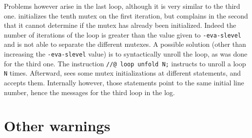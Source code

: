 \documentclass{frama-c-book}
\begin{document}
Problems however arise in the last loop, although it is very similar
to the third one. \mthread initializes the tenth mutex on the first
iteration, but complains in the second that it cannot determine if the mutex has
already been initialized. Indeed the number of iterations of the loop is greater
than the value given to \verb+-eva-slevel+ and \mthread is not able to separate
the different mutexes. A possible solution (other than increasing the
\verb+-eva-slevel+ value) is to syntactically unroll the loop, as was done for
the third one. The instruction \verb+//@ loop unfold N;+ instructs \FramaC to
unroll a loop \verb+N+ times. Afterward, \mthread sees some mutex
initializations at different statements, and accepts them. Internally however,
those statements point to the same initial line number, hence the messages for
the third loop in the log.

\section{Other \mthread warnings}
\label{sec:mthread-warnings}
\end{document}
